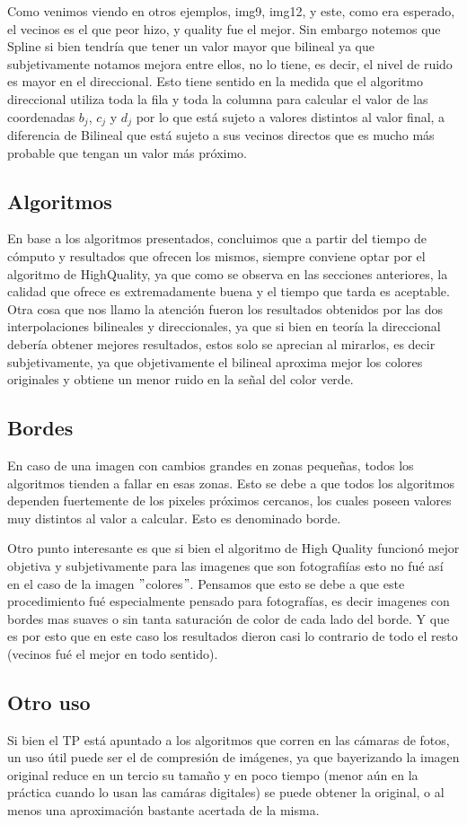Como venimos viendo en otros ejemplos, img9, img12, y este, como era esperado, el vecinos es el que peor hizo, y quality fue el mejor. Sin embargo notemos que Spline si bien 
tendría que tener un valor mayor que bilineal ya que subjetivamente notamos mejora entre ellos, no lo tiene, es 
decir, el nivel de ruido es mayor en el direccional. Esto tiene sentido en la medida que el algoritmo direccional 
utiliza toda la fila y toda la columna para calcular el valor de las coordenadas $b_j$, $c_j$ y $d_j$ por lo que está 
sujeto a valores distintos al valor final, a diferencia de Bilineal que está sujeto a sus vecinos directos que es 
mucho más probable que tengan un valor más próximo. 


\subsection{Algoritmos}
En base a los algoritmos presentados, concluimos que a partir del tiempo de cómputo y resultados que ofrecen los mismos, siempre conviene optar por el algoritmo de HighQuality, ya que como se observa en las secciones anteriores, la calidad que ofrece es extremadamente buena y el tiempo que tarda es aceptable.
Otra cosa que nos llamo la atención fueron los resultados obtenidos por las dos interpolaciones bilineales y direccionales, ya que si bien en teoría la direccional debería obtener mejores resultados, estos solo se aprecian al mirarlos, es decir subjetivamente, ya que objetivamente el bilineal aproxima mejor los colores originales y obtiene un menor ruido en la señal del color verde.

\subsection{Bordes}
En caso de una imagen con cambios grandes en zonas pequeñas, todos los algoritmos tienden a fallar en esas zonas.
Esto se debe a que todos los algoritmos dependen fuertemente de los pixeles próximos cercanos, los cuales poseen valores muy distintos al valor a calcular. Esto es denominado borde.

Otro punto interesante es que si bien el algoritmo de High Quality funcionó mejor objetiva y subjetivamente para las imagenes que son fotografiías esto no fué así en el caso de la imagen $"$colores$"$. Pensamos que esto se debe a que este procedimiento fué especialmente pensado para fotografías, es decir imagenes con bordes mas suaves o sin tanta saturación de color de cada lado del borde. Y que es por esto que en este caso los resultados dieron casi lo contrario de todo el resto (vecinos fué el mejor en todo sentido).

\subsection{Otro uso}
Si bien el TP está apuntado a los algoritmos que corren en las cámaras de fotos, un uso útil puede ser el de compresión de imágenes, ya que bayerizando la imagen original reduce en un tercio su tamaño y en poco tiempo (menor aún en la práctica cuando lo usan las camáras digitales) se puede obtener la original, o al menos una aproximación bastante acertada de la misma.